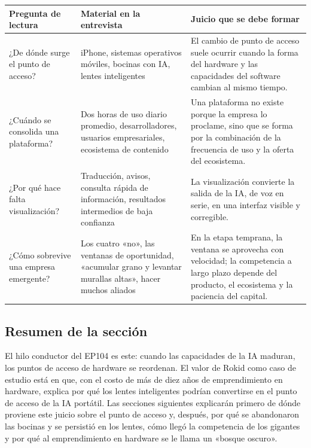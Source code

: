 \noindent\begin{tabularx}{\textwidth}{p{}p{}X}
\toprule
Pregunta de lectura & Material en la entrevista & Juicio que se debe formar \\
\midrule
¿De dónde surge el punto de acceso? & iPhone, sistemas operativos móviles, bocinas con IA, lentes inteligentes & El cambio de punto de acceso suele ocurrir cuando la forma del hardware y las capacidades del software cambian al mismo tiempo. \\
¿Cuándo se consolida una plataforma? & Dos horas de uso diario promedio, desarrolladores, usuarios empresariales, ecosistema de contenido & Una plataforma no existe porque la empresa lo proclame, sino que se forma por la combinación de la frecuencia de uso y la oferta del ecosistema. \\
¿Por qué hace falta visualización? & Traducción, avisos, consulta rápida de información, resultados intermedios de baja confianza & La visualización convierte la salida de la IA, de voz en serie, en una interfaz visible y corregible. \\
¿Cómo sobrevive una empresa emergente? & Los cuatro «no», las ventanas de oportunidad, «acumular grano y levantar murallas altas», hacer muchos aliados & En la etapa temprana, la ventana se aprovecha con velocidad; la competencia a largo plazo depende del producto, el ecosistema y la paciencia del capital. \\
\bottomrule
\end{tabularx}

\subsection{Resumen de la sección}

El hilo conductor del EP104 es este: cuando las capacidades de la IA maduran, los puntos de acceso de hardware se reordenan. El valor de Rokid como caso de estudio está en que, con el costo de más de diez años de emprendimiento en hardware, explica por qué los lentes inteligentes podrían convertirse en el punto de acceso de la IA portátil. Las secciones siguientes explicarán primero de dónde proviene este juicio sobre el punto de acceso y, después, por qué se abandonaron las bocinas y se persistió en los lentes, cómo llegó la competencia de los gigantes y por qué al emprendimiento en hardware se le llama un «bosque oscuro».
